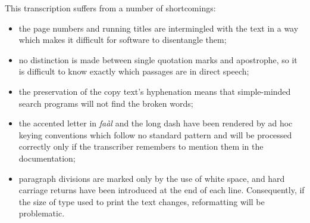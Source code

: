 \documentclass[11pt,twoside]{article}\makeatletter
\begin{document}
\par\egroup 
\par
This transcription suffers from a number of shortcomings: \begin{itemize}
\item the page numbers and running titles are intermingled with the text in a way which makes it difficult for software to disentangle them;
\item no distinction is made between single quotation marks and apostrophe, so it is difficult to know exactly which passages are in direct speech;
\item the preservation of the copy text's hyphenation means that simple-minded search programs will not find the broken words;
\item the accented letter in \textit{faàl} and the long dash have been rendered by ad hoc keying conventions which follow no standard pattern and will be processed correctly only if the transcriber remembers to mention them in the documentation;
\item paragraph divisions are marked only by the use of white space, and hard carriage returns have been introduced at the end of each line. Consequently, if the size of type used to print the text changes, reformatting will be problematic.
\end{itemize} \par
\end{document}
